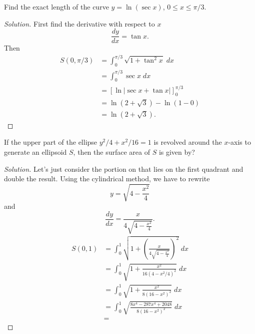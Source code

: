 \begin{problem}[Spring 2014, \# 9]
Find the exact length of the curve $y=\ln(\sec x)$, $0\leq x\leq\pi/3$.
\end{problem}
\begin{proof}[Solution]
First find the derivative with respect to $x$
\[
\frac{dy}{dx}=\tan x.
\]
Then
\begin{align*}
S(0,\pi/3)
&=\int_0^{\pi/3}\sqrt{1+\tan^2x}\;dx\\
&=\int_0^{\pi/3}\sec x\;dx\\
&=\left[\ln|\sec x+\tan x|\right]_0^{\pi/3}\\
&=\ln\left(2+\sqrt{3}\right)-\ln(1-0)\\
&=\boxed{\ln\left(2+\sqrt{3}\right).}
\end{align*}
\end{proof}

\begin{problem}[Spring 2015, \# 9]
If the upper part of the ellipse $y^2/4+x^2/16=1$ is revolved around the
$x$-axis to generate an ellipsoid $S$, then the surface area of $S$ is
given by?
\end{problem}
\begin{proof}[Solution]
Let's just consider the portion on that lies on the first quadrant and
double the result. Using the cylindrical method, we have to rewrite
\[
y=\sqrt{4-\frac{x^2}{4}}
\]
and
\[
\frac{dy}{dx}=\frac{x}{4\sqrt{4-\frac{x^2}{4}}}.
\]
\begin{align*}
S(0,1)
&=\int_0^1\sqrt{1+\left(\frac{x}{4\sqrt{4-\frac{x^2}{4}}}\right)^2}\;dx\\
&=\int_0^1\sqrt{1+\frac{x^2}{16(4-x^2/4)^2}}\;dx\\
&=\int_0^1\sqrt{1+\frac{x^2}{8(16-x^2)^2}}\;dx\\
&=\int_0^1\sqrt{\frac{8x^4-287x^4+2048}{8(16-x^2)^2}}\;dx\\
&=
\end{align*}
\end{proof}

